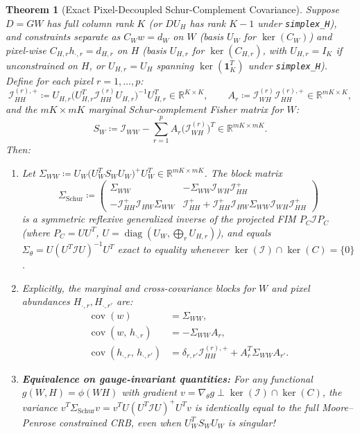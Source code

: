 \documentclass[11pt,a4paper]{article}
\theoremstyle{plain}
\newtheorem{theorem}{Theorem}[section]
\theoremstyle{definition}
\theoremstyle{remark}
\newcommand{\R}{\mathbb{R}}
\newcommand{\cI}{\mathcal{I}}
\newcommand{\diag}{\operatorname{diag}}
\newcommand{\cov}{\operatorname{cov}}
\newcommand{\one}{\mathbf{1}}
\newcommand{\pinv}{^{+}}
\begin{document}
\begin{theorem}[Exact Pixel-Decoupled Schur-Complement Covariance]
\label{thm:schur}
Suppose $D = GW$ has full column rank $K$ (or $D U_H$ has rank $K-1$ under \texttt{simplex\_H}), and constraints separate as $C_W w = d_W$ on $W$ (basis $U_W$ for $\ker(C_W)$) and pixel-wise $C_{H,r} h_{\cdot, r} = d_{H,r}$ on $H$ (basis $U_{H,r}$ for $\ker(C_{H,r})$, with $U_{H,r} = I_K$ if unconstrained on $H$, or $U_{H,r} = U_H$ spanning $\ker(\one_K^T)$ under \texttt{simplex\_H}). Define for each pixel $r = 1,\dots,p$:
\begin{equation}
\label{eq:pixel_schur_mats}
\cI_{HH}^{(r),+} \coloneqq U_{H,r} \big(U_{H,r}^T \cI_{HH}^{(r)} U_{H,r}\big)^{-1} U_{H,r}^T \in \R^{K \times K}, \qquad
A_r \coloneqq \cI_{WH}^{(r)} \cI_{HH}^{(r),+} \in \R^{mK \times K},
\end{equation}
and the $mK \times mK$ marginal Schur-complement Fisher matrix for $W$:
\begin{equation}
\label{eq:S_W}
S_W \coloneqq \cI_{WW} - \sum_{r=1}^p A_r \big(\cI_{WH}^{(r)}\big)^T \in \R^{mK \times mK}.
\end{equation}
Then:
\begin{enumerate}[leftmargin=1.5em]
    \item Let $\Sigma_{WW} \coloneqq U_W \big(U_W^T S_W U_W\big)\pinv U_W^T \in \R^{mK \times mK}$. The block matrix
    \begin{equation}
    \label{eq:sigma_schur_full}
    \Sigma_{\text{Schur}} \coloneqq \begin{pmatrix}
    \Sigma_{WW} & -\Sigma_{WW} \cI_{WH} \cI_{HH}^+ \\
    -\cI_{HH}^+ \cI_{HW} \Sigma_{WW} & \cI_{HH}^+ + \cI_{HH}^+ \cI_{HW} \Sigma_{WW} \cI_{WH} \cI_{HH}^+
    \end{pmatrix}
    \end{equation}
    is a symmetric reflexive generalized inverse of the projected FIM $P_C \cI P_C$ (where $P_C = U U^T$, $U = \diag(U_W, \bigoplus_r U_{H,r})$), and equals $\Sigma_\theta = U (U^T \cI U)^{-1} U^T$ \emph{exact to equality} whenever $\ker(\cI)\cap\ker(C)=\{0\}$.
    \item Explicitly, the marginal and cross-covariance blocks for $W$ and pixel abundances $H_{\cdot, r}, H_{\cdot, r'}$ are:
    \begin{align}
    \cov(w) &= \Sigma_{WW}, \label{eq:cov_w}\\
    \cov(w,\, h_{\cdot, r}) &= -\Sigma_{WW} A_r, \label{eq:cov_wh}\\
    \cov(h_{\cdot, r},\, h_{\cdot, r'}) &= \delta_{r,r'} \cI_{HH}^{(r),+} + A_r^T \Sigma_{WW} A_{r'}. \label{eq:cov_hh}
    \end{align}
    \item \textbf{Equivalence on gauge-invariant quantities:} For any functional $g(W,H) = \phi(WH)$ with gradient $v = \nabla_\theta g \perp \ker(\cI)\cap\ker(C)$, the variance $v^T \Sigma_{\text{Schur}} v = v^T U (U^T \cI U)\pinv U^T v$ is \emph{identically equal} to the full Moore--Penrose constrained CRB, even when $U_W^T S_W U_W$ is singular!
\end{enumerate}
\end{theorem}
\end{document}
